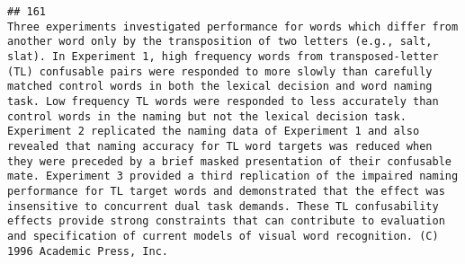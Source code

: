 \documentclass[
  english,
  man]{apa6}
\begin{document}
\begin{verbatim}
## 161                                                                                                                                                                                                                                                                                                                                                                                                                                                                                                                                                                                                                                                                                                                                                                                                                                                                                                                                                                                                                                                                                                                                                                                                                                                                                                                                                                                                                                                                                                                                                                                      Three experiments investigated performance for words which differ from another word only by the transposition of two letters (e.g., salt, slat). In Experiment 1, high frequency words from transposed-letter (TL) confusable pairs were responded to more slowly than carefully matched control words in both the lexical decision and word naming task. Low frequency TL words were responded to less accurately than control words in the naming but not the lexical decision task. Experiment 2 replicated the naming data of Experiment 1 and also revealed that naming accuracy for TL word targets was reduced when they were preceded by a brief masked presentation of their confusable mate. Experiment 3 provided a third replication of the impaired naming performance for TL target words and demonstrated that the effect was insensitive to concurrent dual task demands. These TL confusability effects provide strong constraints that can contribute to evaluation and specification of current models of visual word recognition. (C) 1996 Academic Press, Inc.

\end{verbatim}
\end{document}
